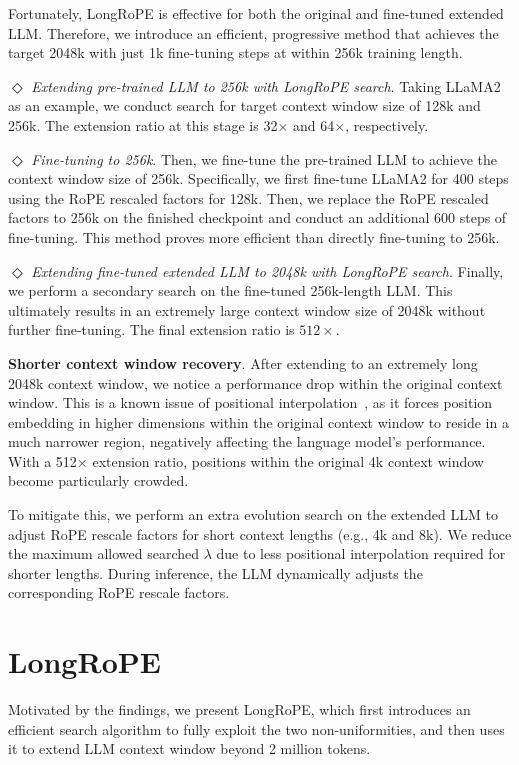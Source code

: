 Fortunately, LongRoPE is effective for both the original and fine-tuned extended LLM. Therefore, we introduce an efficient, progressive method that achieves the target 2048k with just 1k fine-tuning steps at within 256k training length.

$\Diamond$ \textit{Extending pre-trained LLM to 256k with LongRoPE search}. Taking LLaMA2 as an example, we conduct search for target context window size of 128k and 256k. The extension ratio at this stage is 32$\times$ and 64$\times$, respectively.

 $\Diamond$ \textit{Fine-tuning to 256k}. Then, we fine-tune the pre-trained LLM to achieve the context window size of 256k. 	Specifically, we first fine-tune LLaMA2 for 400 steps using the RoPE rescaled factors for 128k. Then, we replace the RoPE rescaled factors to 256k on the finished checkpoint and conduct an additional 600 steps of fine-tuning. This method proves more efficient than directly fine-tuning to 256k.

 $\Diamond$ \textit{Extending fine-tuned extended LLM to 2048k with LongRoPE search}. Finally, we perform a secondary  search on the fine-tuned 256k-length LLM. This ultimately results in an extremely large context window size of 2048k without further fine-tuning. The final extension ratio is  $512\times$.	

\textbf{Shorter context window recovery}.  After extending to an extremely long 2048k context window, we notice a performance drop within the original context window. This is a known issue of positional interpolation~\cite{pi}, as it forces position embedding in higher dimensions within the original context window to reside in a much narrower region, negatively affecting the language model's performance. With a 512$\times$ extension ratio, positions within the original 4k context window become particularly crowded.

To mitigate this, we perform an extra evolution search on the extended LLM to adjust RoPE rescale factors for short context lengths (e.g., 4k and 8k). We reduce the maximum allowed searched $\lambda$ due to less positional interpolation required for shorter lengths. During inference, the LLM dynamically adjusts the corresponding RoPE rescale factors.

\section{LongRoPE}

\label{sec:method}
Motivated by the findings, we present LongRoPE, which first introduces an efficient search algorithm to fully exploit the two non-uniformities, and then uses it to extend LLM context window beyond 2 million tokens. 

